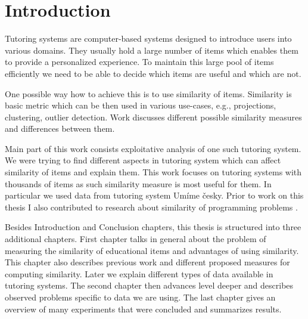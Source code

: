 \documentclass[
  digital, %
  table,   %
  nolof,     %
  nolot,     %
  nocover,
  color
]{fithesis3}
\begin{document}
\newcommand{\ppl}[1]{\textcolor[rgb]{0.6,0.2,1.0}{#1}}
\newcommand{\umimeCesky}{Umíme česky}



\chapter*{Introduction}



Tutoring systems are computer-based systems designed to introduce users into various domains. They usually hold a large number of items which enables them to provide a personalized experience. To maintain this large pool of items efficiently we need to be able to decide which items are useful and which are not.


One possible way how to achieve this is to use similarity of items. Similarity is basic metric which can be then used in various use-cases, e.g., projections, clustering, outlier detection. Work discusses different possible similarity measures and differences between them.


Main part of this work consists exploitative analysis of one such tutoring system. We were trying to find different aspects in tutoring system which can affect similarity of items and explain them. This work focuses on tutoring systems with thousands of items as such similarity measure is most useful for them. In particular we used data from tutoring system \umimeCesky{}. Prior to work on this thesis I also contributed to research about similarity of programming problems \cite{pelanek2018programming}.


Besides Introduction and Conclusion chapters, this thesis is structured into three additional chapters. First chapter talks in general about the problem of measuring the similarity of educational items and advantages of using similarity. This chapter also describes previous work and different proposed measures for computing similarity. Later we explain different types of data available in tutoring systems. The second chapter then advances level deeper and describes observed problems specific to data we are using.
The last chapter gives an overview of many experiments that were concluded and summarizes results.
\end{document}
